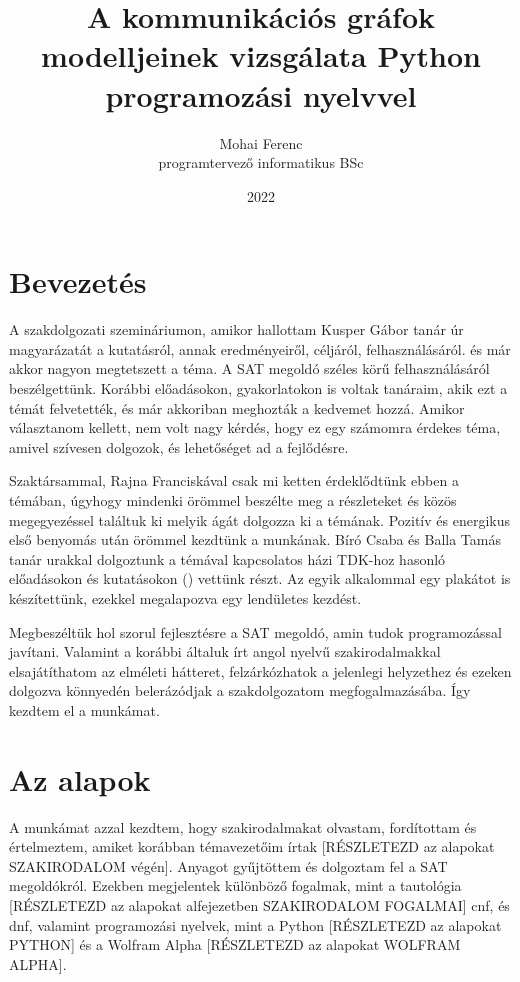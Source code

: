 \documentclass[
]{thesis-ekf}
\theoremstyle{definition}
\theoremstyle{remark}
\begin{document}
	\title{A kommunikációs gráfok modelljeinek vizsgálata Python programozási nyelvvel}
	\author{Mohai Ferenc\\programtervező informatikus BSc}
	\date{2022}
	
	\maketitle
	\tableofcontents
	
	\chapter*{Bevezetés}
	A szakdolgozati szemináriumon, amikor hallottam Kusper Gábor tanár úr magyarázatát a kutatásról, annak eredményeiről, céljáról, felhasználásáról. és már akkor nagyon megtetszett a téma. A SAT megoldó széles körű felhasználásáról beszélgettünk. Korábbi előadásokon, gyakorlatokon is voltak tanáraim, akik ezt a témát felvetették, és már akkoriban meghozták a kedvemet hozzá. Amikor választanom kellett, nem volt nagy kérdés, hogy ez egy számomra érdekes téma, amivel szívesen dolgozok, és lehetőséget ad a fejlődésre.

	Szaktársammal, Rajna Franciskával csak mi ketten érdeklődtünk ebben a témában, úgyhogy mindenki örömmel beszélte meg a részleteket és közös megegyezéssel találtuk ki melyik ágát dolgozza ki a témának. Pozitív és energikus első benyomás után örömmel kezdtünk a munkának. Bíró Csaba és Balla Tamás tanár urakkal dolgoztunk a témával kapcsolatos házi TDK-hoz hasonló előadásokon és kutatásokon (\cite[ICAI2020, AM2020]{am}) vettünk részt. Az egyik alkalommal egy plakátot is készítettünk, ezekkel megalapozva egy lendületes kezdést.
	
	Megbeszéltük hol szorul fejlesztésre a SAT megoldó, amin tudok programozással javítani. Valamint a korábbi általuk írt angol nyelvű szakirodalmakkal elsajátíthatom az elméleti hátteret, felzárkózhatok a jelenlegi helyzethez és ezeken dolgozva könnyedén belerázódjak a szakdolgozatom megfogalmazásába. Így kezdtem el a munkámat.
	
	\chapter{Az alapok}
	
	A munkámat azzal kezdtem, hogy szakirodalmakat olvastam, fordítottam és értelmeztem, amiket korábban témavezetőim írtak [RÉSZLETEZD az alapokat SZAKIRODALOM végén]. Anyagot gyűjtöttem és dolgoztam fel a SAT megoldókról. Ezekben megjelentek különböző fogalmak, mint a tautológia [RÉSZLETEZD az alapokat alfejezetben SZAKIRODALOM FOGALMAI] cnf, és dnf, valamint programozási nyelvek, mint a Python [RÉSZLETEZD az alapokat PYTHON] és a Wolfram Alpha [RÉSZLETEZD az alapokat WOLFRAM ALPHA].
		
\end{document}
